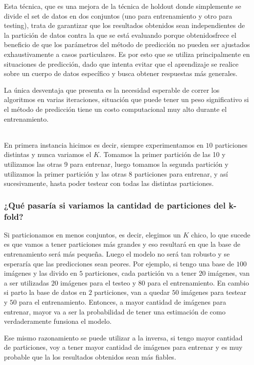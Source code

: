Esta técnica, que es una mejora de la técnica de holdout donde simplemente se divide el set de datos en dos conjuntos (uno para entrenamiento y otro para testing), trata de garantizar que los resultados obtenidos sean independientes de la partición de datos contra la que se está evaluando porque obtenidosfrece el beneficio de que los parámetros del método de predicción no pueden ser ajustados exhaustivamente a casos particulares. Es por esto que se utiliza principalmente en situaciones de predicción, dado que intenta evitar que el aprendizaje se realice sobre un cuerpo de datos específico y busca obtener respuestas más generales.

La única desventaja que presenta es la necesidad esperable de correr los algoritmos en varias iteraciones, situación que puede tener un peso significativo si el método de predicción tiene un costo computacional muy alto durante el entrenamiento. 

\\
En primera instancia hicimos  es decir, siempre experimentamos en $10$ particiones distintas y nunca variamos el $K$. Tomamos la primer partición de las 10 y utilizamos las otras 9 para entrenar, luego tomamos la segunda partición y utilizamos la primer partición y las otras $8$ particiones para entrenar, y así sucesivamente, hasta poder testear con todas las distintas particiones.


\subsubsection{¿Qué pasaría si variamos la cantidad de particiones del k-fold?}

Si particionamos en menos conjuntos, es decir, elegimos un $K$ chico, lo que sucede es que vamos a tener particiones más grandes y eso resultará en que la base de entrenamiento será más pequeña. Luego el modelo no será tan robusto y se esperaría que las predicciones sean peores. Por ejemplo, si tengo una base de $100$ imágenes y las divido en $5$ particiones, cada partición va a tener $20$ imágenes, van a ser utilizadas $20$ imágenes para el testeo y $80$ para el entrenamiento. En cambio si parto la base de datos en $2$ particiones, van a quedar $50$ imágenes para testear y $50$ para el entrenamiento. Entonces, a mayor cantidad de imágenes para entrenar, mayor va a ser la probabilidad de tener una estimación de como verdaderamente funsiona el modelo.

Ese mismo razonamiento se puede utilizar a la inversa, si tengo mayor cantidad de particiones, voy a tener mayor cantidad de imágenes para entrenar y es muy probable que la los resultados obtenidos sean más fiables.

